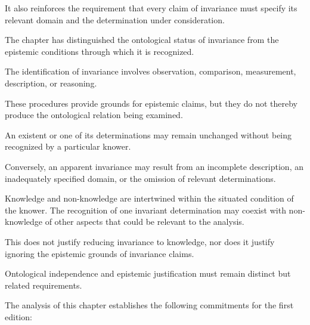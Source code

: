 It also reinforces the requirement
that every claim of invariance
must specify its relevant domain
and the determination under
consideration.


The chapter has distinguished
the ontological status of
invariance from the epistemic
conditions through which
it is recognized.

The identification of invariance
involves observation, comparison,
measurement, description,
or reasoning.

These procedures provide
grounds for epistemic claims,
but they do not thereby produce
the ontological relation being
examined.

An existent or one of its
determinations may remain
unchanged without being
recognized by a particular
knower.

Conversely, an apparent
invariance may result from
an incomplete description,
an inadequately specified
domain, or the omission
of relevant determinations.

Knowledge and non-knowledge
are intertwined within the
situated condition of the
knower. The recognition
of one invariant determination
may coexist with non-knowledge
of other aspects that could
be relevant to the analysis.

This does not justify reducing
invariance to knowledge, nor
does it justify ignoring the
epistemic grounds of invariance
claims.

Ontological independence and
epistemic justification must
remain distinct but related
requirements.


The analysis of this chapter
establishes the following
commitments for the first
edition:

